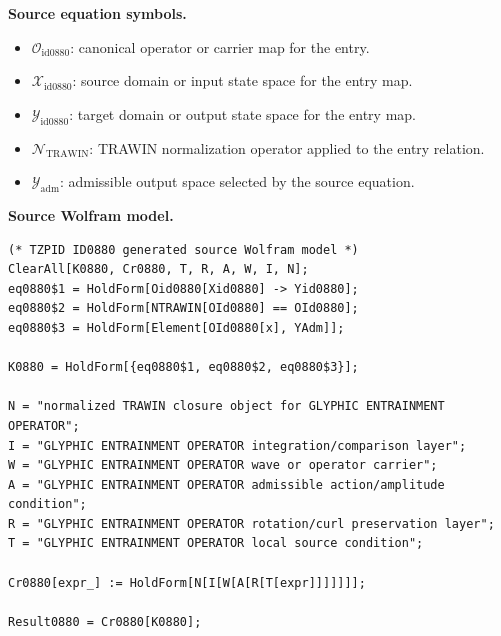\begin{minipage}[t]{0.49\linewidth}
\begingroup
\small
\raggedright
\textbf{Source equation symbols.}\par
\begin{itemize}[leftmargin=1.35em,itemsep=1pt,topsep=1pt,parsep=0pt]
    \item $\mathcal{O}_{\mathrm{id0880}}$: canonical operator or carrier map for the entry.
    \item $\mathcal{X}_{\mathrm{id0880}}$: source domain or input state space for the entry map.
    \item $\mathcal{Y}_{\mathrm{id0880}}$: target domain or output state space for the entry map.
    \item $\mathcal{N}_{\mathrm{TRAWIN}}$: TRAWIN normalization operator applied to the entry relation.
    \item $\mathcal{Y}_{\mathrm{adm}}$: admissible output space selected by the source equation.
\end{itemize}
\endgroup
\end{minipage}\hfill
\begin{minipage}[t]{0.47\linewidth}
\begingroup
\scriptsize
\raggedright
\textbf{Source Wolfram model.}\par
\begin{Verbatim}[fontsize=\tiny,breaklines=true,breakanywhere=true]
(* TZPID ID0880 generated source Wolfram model *)
ClearAll[K0880, Cr0880, T, R, A, W, I, N];
eq0880$1 = HoldForm[Oid0880[Xid0880] -> Yid0880];
eq0880$2 = HoldForm[NTRAWIN[OId0880] == OId0880];
eq0880$3 = HoldForm[Element[OId0880[x], YAdm]];

K0880 = HoldForm[{eq0880$1, eq0880$2, eq0880$3}];

N = "normalized TRAWIN closure object for GLYPHIC ENTRAINMENT OPERATOR";
I = "GLYPHIC ENTRAINMENT OPERATOR integration/comparison layer";
W = "GLYPHIC ENTRAINMENT OPERATOR wave or operator carrier";
A = "GLYPHIC ENTRAINMENT OPERATOR admissible action/amplitude condition";
R = "GLYPHIC ENTRAINMENT OPERATOR rotation/curl preservation layer";
T = "GLYPHIC ENTRAINMENT OPERATOR local source condition";

Cr0880[expr_] := HoldForm[N[I[W[A[R[T[expr]]]]]]];

Result0880 = Cr0880[K0880];
\end{Verbatim}
\endgroup
\end{minipage}

